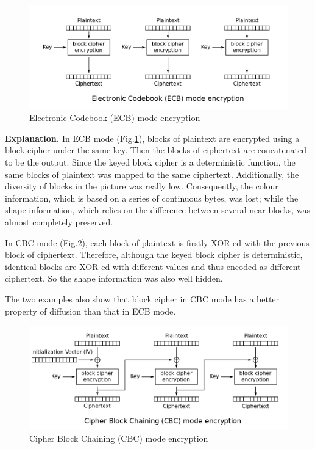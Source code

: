 \begin{figure}[ht!]
\centering
\includegraphics[width=\columnwidth]{pictures/ECB_encryption.png}
\caption{
    Electronic Codebook (ECB) mode encryption \protect\footnotemark
}
\label{fig:ECB_encryption}
\end{figure}


\textbf{Explanation.}
In ECB mode (Fig.\ref{fig:ECB_encryption}), blocks of plaintext are encrypted using a block cipher under the same key. 
Then the blocks of ciphertext are concatenated to be the output.
Since the keyed block cipher is a deterministic function, the same blocks of plaintext was mapped to the same ciphertext.
Additionally, the diversity of blocks in the picture was really low.
Consequently, the colour information, which is based on a series of continuous bytes, was lost; while the shape information, which relies on the difference between several near blocks, was almost completely preserved. 

In CBC mode (Fig.\ref{fig:CBC_encryption}), each block of plaintext is firstly XOR-ed with the previous block of ciphertext. Therefore, although the keyed block cipher is deterministic, identical blocks are XOR-ed with different values and thus encoded as different ciphertext. So the shape information was also well hidden. 

The two examples also show that block cipher in CBC mode has a better property of diffusion than that in ECB mode.

\begin{figure}[ht!]
\centering
\includegraphics[width=\columnwidth]{pictures/CBC_encryption.png}
\caption{
    Cipher Block Chaining (CBC) mode encryption
}
\label{fig:CBC_encryption}
\end{figure}

